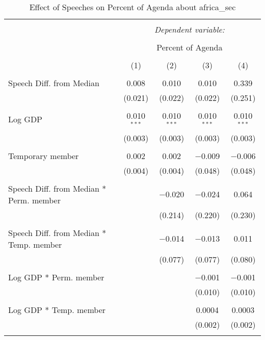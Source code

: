 
\begin{table}[!htbp] \centering 
  \caption{Effect of Speeches on Percent of Agenda about  africa_sec} 
  \label{} 
\begin{tabular}{@{\extracolsep{5pt}}lcccc} 
\\[-1.8ex]\hline 
\hline \\[-1.8ex] 
 & \multicolumn{4}{c}{\textit{Dependent variable:}} \\ 
\cline{2-5} 
\\[-1.8ex] & \multicolumn{4}{c}{Percent of Agenda} \\ 
\\[-1.8ex] & (1) & (2) & (3) & (4)\\ 
\hline \\[-1.8ex] 
 Speech Diff. from Median & 0.008 & 0.010 & 0.010 & 0.339 \\ 
  & (0.021) & (0.022) & (0.022) & (0.251) \\ 
  & & & & \\ 
 Log GDP & 0.010$^{***}$ & 0.010$^{***}$ & 0.010$^{***}$ & 0.010$^{***}$ \\ 
  & (0.003) & (0.003) & (0.003) & (0.003) \\ 
  & & & & \\ 
 Temporary member & 0.002 & 0.002 & $-$0.009 & $-$0.006 \\ 
  & (0.004) & (0.004) & (0.048) & (0.048) \\ 
  & & & & \\ 
 Speech Diff. from Median * Perm. member &  & $-$0.020 & $-$0.024 & 0.064 \\ 
  &  & (0.214) & (0.220) & (0.230) \\ 
  & & & & \\ 
 Speech Diff. from Median * Temp. member &  & $-$0.014 & $-$0.013 & 0.011 \\ 
  &  & (0.077) & (0.077) & (0.080) \\ 
  & & & & \\ 
 Log GDP * Perm. member &  &  & $-$0.001 & $-$0.001 \\ 
  &  &  & (0.010) & (0.010) \\ 
  & & & & \\ 
 Log GDP * Temp. member &  &  & 0.0004 & 0.0003 \\ 
  &  &  & (0.002) & (0.002) \\ 
  & & & & \\ 

\end{tabular}
\end{table}
